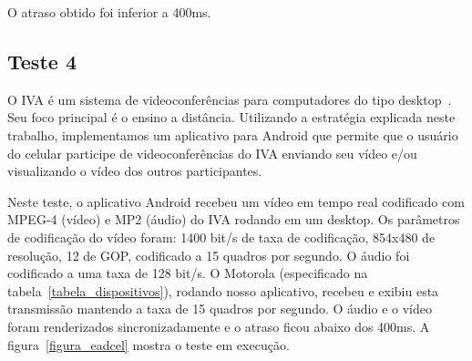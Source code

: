 \documentclass{acm_proc_article-sp}
\begin{document}
O atraso obtido foi inferior a 400ms.

\subsection{Teste 4}
O IVA é um sistema de videoconferências para computadores do tipo desktop~\cite{roesler_iva}. Seu foco principal é o ensino a distância. Utilizando a estratégia explicada neste trabalho, implementamos um aplicativo para Android que permite que o usuário do celular participe de videoconferências do IVA enviando seu vídeo e/ou visualizando o vídeo dos outros participantes.

Neste teste, o aplicativo Android recebeu um vídeo em tempo real codificado com MPEG-4 (vídeo) e MP2 (áudio) do IVA rodando em um desktop. Os parâmetros de codificação do vídeo foram: 1400 bit/s de taxa de codificação, 854x480 de resolução, 12 de GOP, codificado a 15 quadros por segundo. O áudio foi codificado a uma taxa de 128 bit/s. O Motorola (especificado na tabela~\ref{tabela_dispositivos}), rodando nosso aplicativo, recebeu e exibiu esta transmissão mantendo a taxa de 15 quadros por segundo. O áudio e o vídeo foram renderizados sincronizadamente e o atraso ficou abaixo dos 400ms. A figura~\ref{figura_eadcel} mostra o teste em execução.
\end{document}
